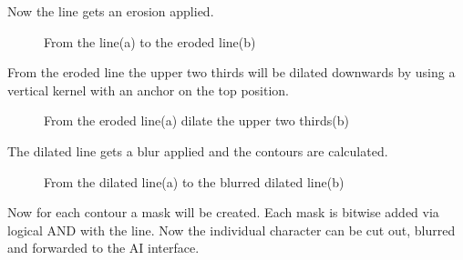 Now the line gets an erosion applied.

\begin{figure}[H]
    \centering
    \qquad
    \caption{From the line(a) to the eroded line(b)}
\end{figure}

From the eroded line the upper two thirds will be dilated downwards by using a vertical kernel with an anchor on the top position.

\begin{figure}[H]
    \centering
    \qquad
    \caption{From the eroded line(a) dilate the upper two thirds(b)}
\end{figure}

The dilated line gets a blur applied and the contours are calculated.

\begin{figure}[H]
    \centering
    \qquad
    \caption{From the dilated line(a) to the blurred dilated line(b)}
\end{figure}

Now for each contour a mask will be created.
Each mask is bitwise added via logical AND with the line.
Now the individual character can be cut out, blurred and forwarded to the AI interface.

